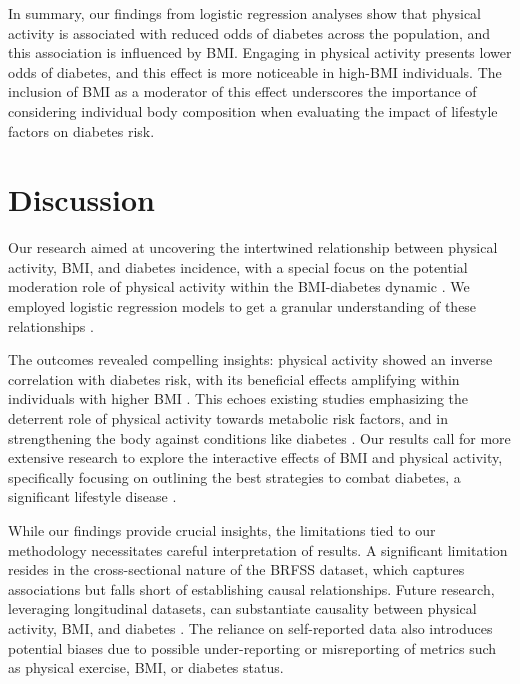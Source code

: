 \documentclass[11pt]{article}
\begin{document}
In summary, our findings from logistic regression analyses show that physical activity is associated with reduced odds of diabetes across the population, and this association is influenced by BMI. Engaging in physical activity presents lower odds of diabetes, and this effect is more noticeable in high-BMI individuals. The inclusion of BMI as a moderator of this effect underscores the importance of considering individual body composition when evaluating the impact of lifestyle factors on diabetes risk.

\section*{Discussion}

Our research aimed at uncovering the intertwined relationship between physical activity, BMI, and diabetes incidence, with a special focus on the potential moderation role of physical activity within the BMI-diabetes dynamic \cite{Bohn2015ImpactOP, Zhao2020PhysicalAL, Mora2007PhysicalAA}. We employed logistic regression models to get a granular understanding of these relationships \cite{Simmons2016EffectOP, Boruvka2016AssessingTC}.

The outcomes revealed compelling insights: physical activity showed an inverse correlation with diabetes risk, with its beneficial effects amplifying within individuals with higher BMI \cite{Mao2022PhysicalAR, Kaizu2014ImpactOL}. This echoes existing studies emphasizing the deterrent role of physical activity towards metabolic risk factors, and in strengthening the body against conditions like diabetes \cite{Wahid2016QuantifyingTA}. Our results call for more extensive research to explore the interactive effects of BMI and physical activity, specifically focusing on outlining the best strategies to combat diabetes, a significant lifestyle disease \cite{Shi2013PhysicalAS}. 

While our findings provide crucial insights, the limitations tied to our methodology necessitates careful interpretation of results. A significant limitation resides in the cross-sectional nature of the BRFSS dataset, which captures associations but falls short of establishing causal relationships. Future research, leveraging longitudinal datasets, can substantiate causality between physical activity, BMI, and diabetes \cite{Rask-Andersen2017GeneenvironmentIS}. The reliance on self-reported data also introduces potential biases due to possible under-reporting or misreporting of metrics such as physical exercise, BMI, or diabetes status.
\end{document}
